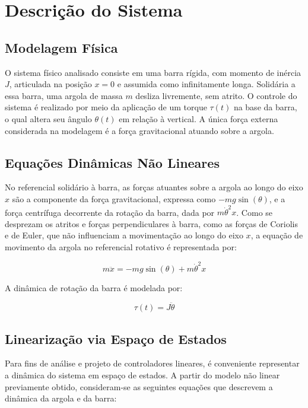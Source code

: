 \documentclass[a4paper, 12pt]{article} %
\begin{document}
\section{Descrição do Sistema}

\subsection{Modelagem Física}

O sistema físico analisado consiste em uma barra rígida, com momento de inércia \( J \), articulada na posição \( x = 0 \) e assumida como infinitamente longa. Solidária a essa barra, uma argola de massa \( m \) desliza livremente, sem atrito. O controle do sistema é realizado por meio da aplicação de um torque \( \tau(t) \) na base da barra, o qual altera seu ângulo \( \theta(t) \) em relação à vertical. A única força externa considerada na modelagem é a força gravitacional atuando sobre a argola.

\subsection{Equações Dinâmicas Não Lineares}

No referencial solidário à barra, as forças atuantes sobre a argola ao longo do eixo \( x \) são a componente da força gravitacional, expressa como \( -mg \sin(\theta) \), e a força centrífuga decorrente da rotação da barra, dada por \( m \dot{\theta}^2 x \). Como se desprezam os atritos e forças perpendiculares à barra, como as forças de Coriolis e de Euler, que não influenciam a movimentação ao longo do eixo \( x \), a equação de movimento da argola no referencial rotativo é representada por:

\begin{equation}
    m \ddot{x} = -mg \sin(\theta) + m \dot{\theta}^2 x
\end{equation}

A dinâmica de rotação da barra é modelada por:

\begin{equation}
    \tau(t) = J \ddot{\theta}
\end{equation}

\subsection{Linearização via Espaço de Estados}

Para fins de análise e projeto de controladores lineares, é conveniente representar a dinâmica do sistema em espaço de estados. A partir do modelo não linear previamente obtido, consideram-se as seguintes equações que descrevem a dinâmica da argola e da barra:
\end{document}
